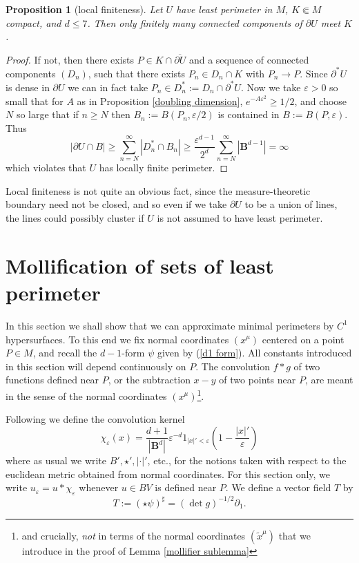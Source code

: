 \documentclass[reqno,12pt,letterpaper]{amsart}
\newcommand{\Ball}{\mathbf{B}}
\newtheorem{proposition}[theorem]{Proposition}
\theoremstyle{definition}
\numberwithin{equation}{section}
\begin{document}
\begin{proposition}[local finiteness]\label{local finiteness}
Let $U$ have least perimeter in $M$, $K \Subset M$ compact, and $d \leq 7$. Then only finitely many connected components of $\partial U$ meet $K$.
\end{proposition}
\begin{proof}
If not, then there exists $P \in K \cap \overline{\partial U}$ and a sequence of connected components $(D_n)$, such that there exists $P_n \in D_n \cap K$ with $P_n \to P$.
Since $\partial^* U$ is dense in $\partial U$ we can in fact take $P_n \in D_n^* := D_n \cap \partial^* U$.
Now we take $\varepsilon > 0$ so small that for $A$ as in Proposition \ref{doubling dimension}, $e^{-A\varepsilon^2} \geq 1/2$, and choose $N$ so large that if $n \geq N$ then $B_n := B(P_n, \varepsilon/2)$ is contained in $B := B(P, \varepsilon)$.
Thus
$$|\partial U \cap B| \geq \sum_{n=N}^\infty |D_n^* \cap B_n| \geq \frac{\varepsilon^{d - 1}}{2^d} \sum_{n=N}^\infty |\Ball^{d - 1}| = \infty$$
which violates that $U$ has locally finite perimeter.
\end{proof}

Local finiteness is not quite an obvious fact, since the measure-theoretic boundary need not be closed, and so even if we take $\partial U$ to be a union of lines, the lines could possibly cluster if $U$ is not assumed to have least perimeter.

\section{Mollification of sets of least perimeter}\label{MollifierSection}
In this section we shall show that we can approximate minimal perimeters by $C^1$ hypersurfaces.
To this end we fix normal coordinates $(x^\mu)$ centered on a point $P \in M$, and recall the $d-1$-form $\psi$ given by (\ref{d1 form}).
All constants introduced in this section will depend continuously on $P$.
The convolution $f * g$ of two functions defined near $P$, or the subtraction $x - y$ of two points near $P$, are meant in the sense of the normal coordinates $(x^\mu)$\footnote{and crucially, \emph{not} in terms of the normal coordinates $(\tilde x^\mu)$ that we introduce in the proof of Lemma \ref{mollifier sublemma}}.

Following \cite[Chapter 7]{Giusti77} we define the convolution kernel
$$\chi_\varepsilon(x) = \frac{d + 1}{|\Ball^d|} \varepsilon^{-d}1_{|x|' < \varepsilon} \left(1 - \frac{|x|'}{\varepsilon}\right)$$
where as usual we write $B', \star', |\cdot|'$, etc., for the notions taken with respect to the euclidean metric obtained from normal coordinates.
For this section only, we write $u_\varepsilon = u * \chi_\varepsilon$ whenever $u \in BV$ is defined near $P$.
We define a vector field $T$ by
\begin{equation}\label{T in coords}
T := (\star \psi)^\sharp = (\det g)^{-1/2} \partial_1.
\end{equation}
\end{document}
